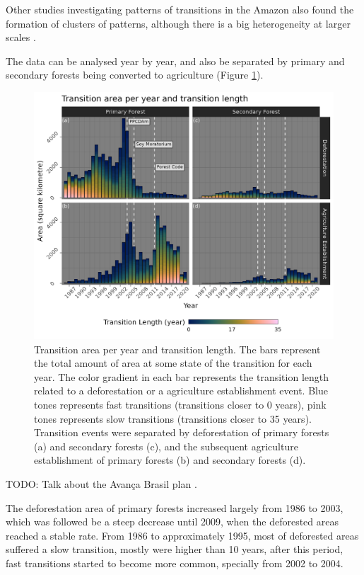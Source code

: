 \documentclass[essd, manuscript]{copernicus}
\begin{document}
Other studies investigating patterns of transitions in the Amazon also found the formation of clusters of patterns, although there is a big heterogeneity at larger scales \citep{MullerHansen2017}.

The data can be analysed year by year, and also be separated by primary and secondary forests being converted to agriculture (Figure \ref{fig:transbar-plot}).

\begin{figure}[ht]
\includegraphics[width=17cm]{figs/trans_length_cols} \caption{Transition area per year and transition length. The bars represent the total amount of area at some state of the transition for each year. The color gradient in each bar represents the transition length related to a deforestation or a agriculture establishment event. Blue tones represents fast transitions (transitions closer to 0 years), pink tones represents slow transitions (transitions closer to 35 years). Transition events were separated by deforestation of primary forests (a) and secondary forests (c), and the subsequent  agriculture establishment of primary forests (b) and secondary forests (d).}\label{fig:transbar-plot}
\end{figure}

TODO: Talk about the Avança Brasil plan \citep{Carvalho2002}.

The deforestation area of primary forests increased largely from 1986 to 2003, which was followed be a steep decrease until 2009, when the deforested areas reached a stable rate.
From 1986 to approximately 1995, most of deforested areas suffered a slow transition, mostly were higher than 10 years, after this period, fast transitions started to become more common, specially from 2002 to 2004.
\end{document}
